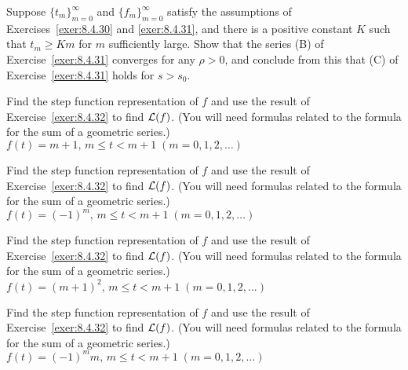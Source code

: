 \documentclass{ximera}
\begin{document}
\begin{problem}\label{exer:8.4.32} Suppose $\{t_m\}_{m=0}^\infty$ and
$\{f_m\}_{m=0}^\infty$ satisfy the assumptions of
Exercises~\ref{exer:8.4.30} and \ref{exer:8.4.31}, and
there is a positive constant $K$ such that $t_m\ge Km$ for $m$
sufficiently large. Show that the series (B) of
Exercise~\ref{exer:8.4.31} converges for any $\rho>0$, and conclude from
this that (C) of Exercise~\ref{exer:8.4.31} holds for $s>s_0$.
\end{problem}



\begin{problem}\label{exer:8.4.33}
 Find the step
function representation of $f$ and use the result of
Exercise~\ref{exer:8.4.32} to find ${\cal L}(f)$. (You will need
formulas related to the formula for the sum of a geometric series.)
$f(t)=m+1,\,m\le t<m+1\; (m=0,1,2,\dots)$
\end{problem}

\begin{problem}\label{exer:8.4.34}
 Find the step
function representation of $f$ and use the result of
Exercise~\ref{exer:8.4.32} to find ${\cal L}(f)$. (You will need
formulas related to the formula for the sum of a geometric series.)
$f(t)=(-1)^m,\,m\le t<m+1\; (m=0,1,2,\dots)$
\end{problem}

\begin{problem}\label{exer:8.4.35}
Find the step function representation of $f$ and use the result of Exercise~\ref{exer:8.4.32} to find ${\cal L}(f)$. (You will need
formulas related to the formula for the sum of a geometric series.)
$f(t)=(m+1)^2,\,m\le t<m+1\; (m=0,1,2,\dots)$
\end{problem}

\begin{problem}\label{exer:8.4.36}
 Find the step
function representation of $f$ and use the result of
Exercise~\ref{exer:8.4.32} to find ${\cal L}(f)$. (You will need
formulas related to the formula for the sum of a geometric series.)
$f(t)=(-1)^mm,\,m\le t<m+1\; (m=0,1,2,\dots)$
\end{problem}
\end{document}
